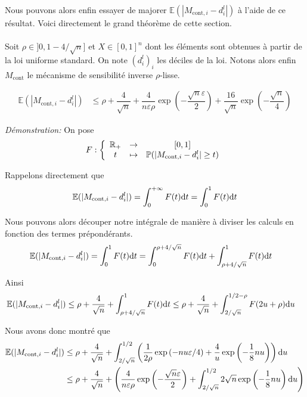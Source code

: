 Nous pouvons alors enfin essayer de majorer \(\mathbb E (|M_{\text{cont}, i} - d_i^l|)\) à l'aide de ce résultat. Voici directement le grand théorème de cette section.\\

\theoreme{}\\
Soit \(\rho \in ]0, 1 - 4/\sqrt n]\) et \(X \in [0,1]^n\) dont les éléments sont obtenues à partir de la loi uniforme standard. On note \((d_i^l)_i\) les déciles de la loi. Notons alors enfin \(M_{\text{cont}}\) le mécanisme de sensibilité inverse \(\rho\)-lisse.

\begin{align*}
    \mathbb E(|M_{\text{cont}, i} - d_i^l|) & \leq \rho + \dfrac{4}{\sqrt n} +\dfrac{4}{n\varepsilon\rho}\exp\left( -\dfrac{\sqrt n \varepsilon}{2} \right) + \dfrac{16}{\sqrt{n}}\exp\left( -\dfrac{\sqrt n }{4} \right)
\end{align*}

\textit{Démonstration:} On pose 
\[
    F : \left\{
        \begin{array}[]{ccc}
            \R_+ & \to & [0,1]\\
            t & \mapsto & \mathbb P(|M_{\text{cont}, i} - d_i^l| \geq t)
        \end{array}
    \right.   
\]

Rappelons directement que
\[
        \mathbb E(|M_{\text{cont}, i} - d_i^l|) = \int_0^{+\infty} F(t) \mathrm{d} t = \int_0^1 F(t) \mathrm{d} t
\]

Nous pouvons alors découper notre intégrale de manière à diviser les calculs en fonction des termes prépondérants. 
\begin{align*}
    \mathbb E(|M_{\text{cont}, i} - d_i^l|) & = \int_0^1 F(t) \mathrm{d} t = \int_0^{\rho + 4/\sqrt n} F(t) \mathrm{d} t + \int_{\rho + 4/\sqrt n}^1 F(t) \mathrm{d} t
\end{align*}

Ainsi
\begin{align*}
    \mathbb E(|M_{\text{cont}, i} - d_i^l|) & \leq \rho + \dfrac{4}{\sqrt n}  + \int_{\rho + 4/\sqrt n}^1 F(t) \mathrm{d} t \leq \rho + \dfrac{4}{\sqrt n}  + \int_{2/\sqrt n}^{1/2 - \rho} F(2u + \rho) \mathrm{d} u
\end{align*}

Nous avons donc montré que
\begin{align*}
    \mathbb E(|M_{\text{cont}, i} - d_i^l|) & \leq \rho + \dfrac{4}{\sqrt n}  + \int_{2/\sqrt n}^{1/2} \left( \dfrac{1}{2\rho}\exp\left( -{nu\varepsilon}/{4} \right) + \dfrac{4}{u}\exp\left( - \dfrac{1}{8}n u \right) \right) \mathrm{d} u\\
     & \leq \rho + \dfrac{4}{\sqrt n}  + \left( \dfrac{4}{n\varepsilon\rho}\exp\left( -\dfrac{\sqrt n \varepsilon}{2} \right) + \int_{2/\sqrt n}^{1/2} 2\sqrt n \exp\left( - \dfrac{1}{8}n u \right) \mathrm{d} u \right)\\
\end{align*}

